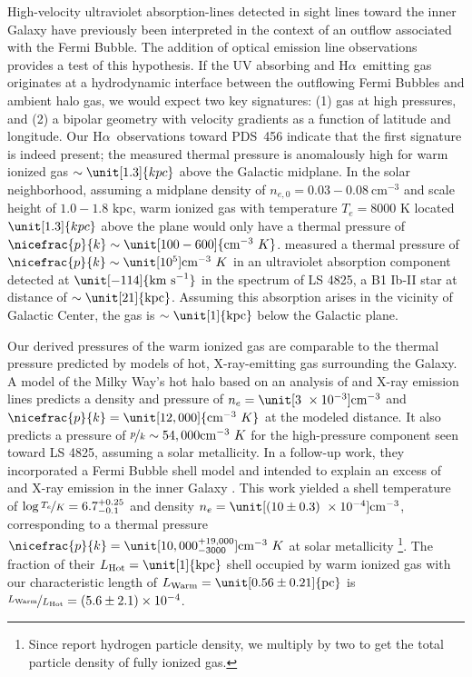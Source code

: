 \documentclass[twocolumn]{aastex63}
\newcommand{\ha}{H\ensuremath{\alpha}}
\newcommand{\kms}{\mathrm{km~s}\ensuremath{^{-1}}}
\begin{document}
High-velocity ultraviolet absorption-lines detected in sight lines toward the inner Galaxy have previously been interpreted in the context of an outflow associated with the Fermi Bubble. The addition of
optical emission line observations provides a test of this hypothesis.
If the UV absorbing and \ha\ emitting gas originates at a hydrodynamic interface between the outflowing Fermi Bubbles and ambient halo gas, we would expect two key signatures: (1) gas at high pressures, and (2) a bipolar geometry with velocity gradients as a function of latitude and longitude. Our \ha\ observations toward PDS~456 indicate that the first signature is indeed present; the measured thermal pressure is anomalously high for warm ionized gas $\sim \unit[1.3]{kpc}$ above the Galactic midplane. In the solar neighborhood, assuming a midplane density of $n_{e,0}=0.03-0.08~{\textrm{cm}^{-3}}$ and scale height of $1.0-1.8$ kpc, warm ionized gas with temperature $T_e=8000$ K located $\unit[1.3]{kpc}$ above the plane would only have a thermal pressure of $\nicefrac{p}{k}\sim\unit[100-600]{\textrm{cm}^{-3}~K}$. 
\citet{Savage2017} measured a thermal pressure of $\nicefrac{p}{k}\sim\unit[10^{5}]{\textrm{cm}^{-3}~K}$ in an ultraviolet absorption component detected at $\unit[-114]{\kms}$ in the spectrum of LS 4825, a B1 Ib-II star at distance of $\sim\unit[21]{\textrm{kpc}}$. Assuming this absorption arises in the vicinity of Galactic Center, the gas is $\sim \unit[1]{\textrm{kpc}}$ below the Galactic plane. 


Our derived pressures of the warm ionized gas are comparable to the thermal pressure predicted by models of hot, X-ray-emitting gas surrounding the Galaxy. A model of the Milky Way's hot halo based on an analysis of  and  X-ray emission lines \citep{Miller2015} predicts a density and pressure of $n_e = \unit[3 ~\times 10^{-3}]{\textrm{cm}^{-3}}$ and  $\nicefrac{p}{k} = \unit[12,000]{\textrm{cm}^{-3}~K}$ at the modeled distance. It also predicts a pressure of $\nicefrac{p}{k}\sim 54,000{\textrm{cm}^{-3}~K}$ for the high-pressure component seen toward LS 4825, assuming a solar metallicity. In a follow-up work, they incorporated a Fermi Bubble shell model and intended to explain an excess of  and  X-ray emission in the inner Galaxy \citep{Miller2016}. This work yielded a shell temperature of $\log{\nicefrac{T_e}{K}} = 6.7^{+0.25}_{-0.1}$ and density $n_e = \unit[\left(10 \pm 0.3\right) ~\times 10^{-4}]{\textrm{cm}^{-3}}$, corresponding to a thermal pressure $\nicefrac{p}{k} = \unit[10,000^{+19,000}_{-3000}]{\textrm{cm}^{-3}~K}$ at solar metallicity \citep{Miller2016}\footnote{Since \citet{Miller2016} report hydrogen particle density, we multiply by two to get the total particle density of fully ionized gas.}.
The fraction of their $L_{\textrm{Hot}} = \unit[1]{\textrm{kpc}}$ shell occupied by warm ionized gas with our characteristic length of $L_{\textrm{Warm}} = \unit[0.56 \pm 0.21]{\textrm{pc}}$ is  $\nicefrac{L_{\textrm{Warm}}}{L_{\textrm{Hot}}} = \left(5.6 \pm 2.1\right)\times10^{-4}$. 
\end{document}
